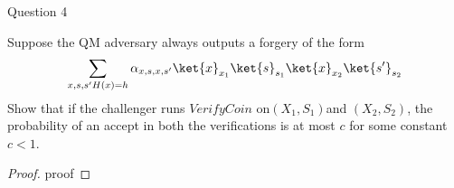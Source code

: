 \begin{solution}{Question 4}\label{ques:4}
    \begin{question}
    Suppose the QM adversary always outputs a forgery of the form
    \[\sum_{x,s,s'\\H(x) = h} \alpha_{x,s,x,s'}\ket{x}_{x_1}\ket{s}_{s_1}\ket{x}_{x_2}\ket{s'}_{s_2} \]
    Show that if the challenger runs $VerifyCoin$ on$ (X_1, S_1) $and $(X_2, S_2)$, the probability of an accept in both the verifications is at most $c$ for some constant $c < 1$.
    \end{question}
    \tcblower{}
    \begin{proof}
    proof
    \end{proof}
\end{solution}
 